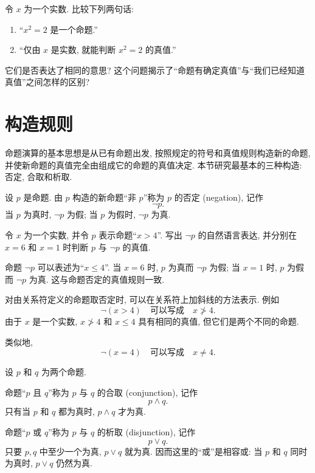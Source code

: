 \documentclass[usesamecnt, thmcnt=section, lang=cn, newtx, 10pt, scheme=chinese]{elegantbook}
\begin{document}
\begin{challenge}
\label{ch:logic-01}
令 $x$ 为一个实数. 比较下列两句话:
\begin{enumerate}[label=\rm(\arabic*)]
  \item ``$x^2=2$ 是一个命题.''
  \item ``仅由 $x$ 是实数, 就能判断 $x^2=2$ 的真值.''
\end{enumerate}
它们是否表达了相同的意思? 这个问题揭示了``命题有确定真值''与``我们已经知道真值''之间怎样的区别?
\end{challenge}

\section{构造规则}

命题演算的基本思想是从已有命题出发, 按照规定的符号和真值规则构造新的命题, 并使新命题的真值完全由组成它的命题的真值决定. 本节研究最基本的三种构造: 否定, 合取和析取.


\begin{definition}
设 $p$ 是命题. 由 $p$ 构造的新命题``非 $p$''称为 $p$ 的{\color{blue}否定 (negation)}, 记作
\[
 \neg p.
\]
当 $p$ 为真时, $\neg p$ 为假; 当 $p$ 为假时, $\neg p$ 为真.
\end{definition}

\begin{concept}
\label{con:logic-02}
令 $x$ 为一个实数, 并令 $p$ 表示命题``$x>4$''. 写出 $\neg p$ 的自然语言表达, 并分别在 $x=6$ 和 $x=1$ 时判断 $p$ 与 $\neg p$ 的真值.
\end{concept}

\begin{solution}
命题 $\neg p$ 可以表述为``$x\leq4$''.
当 $x=6$ 时, $p$ 为真而 $\neg p$ 为假; 当 $x=1$ 时, $p$ 为假而 $\neg p$ 为真. 这与命题否定的真值规则一致.
\end{solution}

\begin{remark}
对由关系符定义的命题取否定时, 可以在关系符上加斜线的方法表示. 例如
\[
 \neg(x>4)\quad\text{可以写成}\quad x\not> 4.
\] 
由于 $x$ 是一个实数, $x\not>4$ 和 $x\leq 4$ 具有相同的真值, 但它们是两个不同的命题.

类似地,
\[
 \neg(x=4)\quad\text{可以写成}\quad x\neq 4.
\]
\end{remark}

\begin{definition}
设 $p$ 和 $q$ 为两个命题.

命题``$p$ 且 $q$''称为 $p$ 与 $q$ 的{\color{blue}合取 (conjunction)}, 记作
\[
 p\wedge q.
\]
只有当 $p$ 和 $q$ 都为真时, $p\wedge q$ 才为真.

命题``$p$ 或 $q$''称为 $p$ 与 $q$ 的{\color{blue}析取 (disjunction)}, 记作
\[
 p\vee q.
\]
只要 $p,q$ 中至少一个为真, $p\vee q$ 就为真. 因而这里的``或''是{相容或}: 当 $p$ 和 $q$ 同时为真时, $p\vee q$ 仍然为真.
\end{definition}
\end{document}
